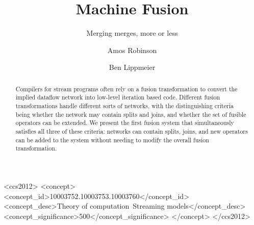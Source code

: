 \documentclass[sigconf,review]{acmart}\settopmatter{printfolios=true}
\begin{document}

\begin{CCSXML}
<ccs2012>
<concept>
<concept_id>10003752.10003753.10003760</concept_id>
<concept_desc>Theory of computation~Streaming models</concept_desc>
<concept_significance>500</concept_significance>
</concept>
</ccs2012>
\end{CCSXML}


\renewcommand{\textrightarrow}{$\rightarrow$}



\title{Machine Fusion}
\subtitle{Merging merges, more or less}

\author{Amos Robinson}

\author{Ben Lippmeier}

\makeatactive
\begin{abstract}
Compilers for stream programs often rely on a fusion transformation to convert the implied dataflow network into low-level iteration based code. Different fusion transformations handle different sorts of networks, with the distinguishing criteria being whether the network may contain splits and joins, and whether the set of fusible operators can be extended. We present the first fusion system that simultaneously satisfies all three of these criteria: networks can contain splits, joins, and new operators can be added to the system without needing to modify the overall fusion transformation.
\end{abstract}

\maketitle






% 


% 



% 
% 
% 
\end{document}
